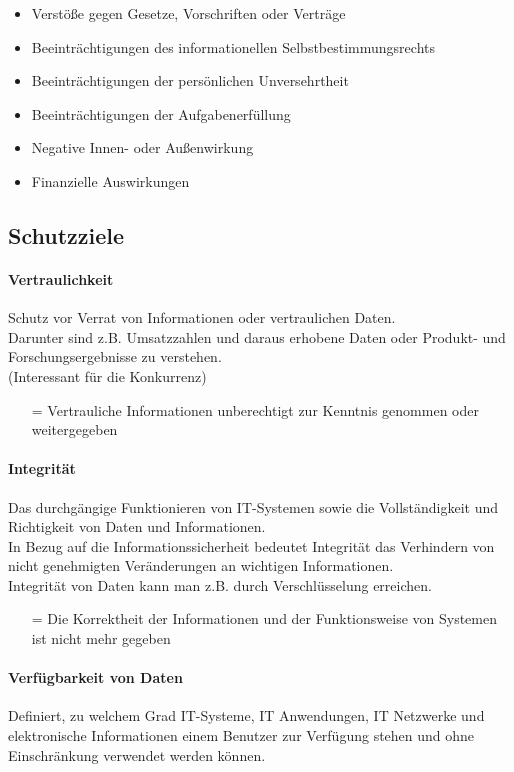 \documentclass[10pt]{article}
\begin{document}
\begin{itemize}
\item Verstöße gegen Gesetze, Vorschriften oder Verträge
\item Beeinträchtigungen des informationellen Selbstbestimmungsrechts
\item Beeinträchtigungen der persönlichen Unversehrtheit
\item Beeinträchtigungen der Aufgabenerfüllung
\item Negative Innen- oder Außenwirkung
\item Finanzielle Auswirkungen
\end{itemize}

\subsection{Schutzziele}

\paragraph{Vertraulichkeit}
Schutz vor Verrat von Informationen oder vertraulichen Daten. \\
Darunter sind z.B. Umsatzzahlen und daraus erhobene Daten oder Produkt- und Forschungsergebnisse zu verstehen. \\
(Interessant für die Konkurrenz) 
\begin{itemize}
\item[=] Vertrauliche Informationen unberechtigt zur Kenntnis genommen oder weitergegeben
\end{itemize}
\paragraph{Integrität}
Das durchgängige Funktionieren von IT-Systemen sowie die Vollständigkeit und Richtigkeit von Daten und Informationen.\\ In Bezug auf die Informationssicherheit bedeutet Integrität das Verhindern von nicht genehmigten Veränderungen an wichtigen Informationen. \\
Integrität von Daten kann man z.B. durch Verschlüsselung erreichen. 

\begin{itemize}
\item[=] Die Korrektheit der Informationen und der Funktionsweise von Systemen ist nicht mehr gegeben
\end{itemize}
\paragraph{Verfügbarkeit  von Daten}
Definiert, zu welchem Grad IT-Systeme, IT Anwendungen, IT Netzwerke und elektronische Informationen einem Benutzer zur Verfügung stehen und ohne Einschränkung verwendet werden können.
\end{document}
